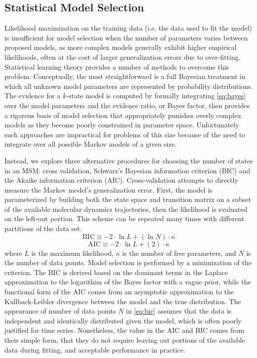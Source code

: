 \documentclass[journal=jpcbfk, layout=traditional, manuscript=article]{achemso}
\begin{document}
\subsection{Statistical Model Selection}
Likelihood maximization on the training data (i.e. the data used to fit the model) is insufficient for model selection when the number of parameters varies between proposed models, as more complex models generally exhibit higher empirical likelihoods, often at the cost of larger generalization errors due to over-fitting\cite{Liddle2007Information, Hastie01Elements}. Statistical learning theory provides a number of methods to overcome this problem. Conceptually, the most straightforward is a full Bayesian treatment in which all unknown model parameters are represented by probability distributions. The evidence for a $k$-state model is computed by formally integrating \cref{eq:bayes} over the model parameters and the evidence ratio, or Bayes factor\cite{Gelfand94Bayesian}, then provides a rigorous basis of model selection that appropriately punishes overly complex models as they become poorly constrained in parameter space. Unfortunately such approaches are impractical for problems of this size because of the need to integrate over all possible Markov models of a given size.

Instead, we explore three alternative procedures for choosing the number of states in an MSM: cross validation, Schwarz's Bayesian information criterion (BIC)\cite{Schwartz78Estimating} and the Akaike information criterion (AIC)\cite{Akaike1974AIC}. Cross-validation attempts to directly measure the Markov model's generalization error. First, the model is parameterized by building both the state space and transition matrix on a subset of the available molecular dynamics trajectories, then the likelihood is evaluated on the left-out portion. This scheme can be repeated many times with different partitions of the data set.
\begin{equation}
  \label{eq:bic}
  \mathrm{BIC} \equiv -2\cdot \ln L + \left(\ln N \right)\cdot \kappa
\end{equation}
\begin{equation}
  \label{eq:aic}
  \mathrm{AIC} \equiv -2\cdot \ln L + \left(2\right) \cdot \kappa
\end{equation} where $L$ is the maximum likelihood, $\kappa$ is the number of free parameters, and $N$ is the number of data points.  Model selection is performed by a minimization of the criterion. The BIC is derived based on the dominant terms in the Laplace approximation to the logarithim of the Bayes factor with a vague prior, while the functional form of the AIC comes from an asymptotic approximation to the Kullback-Leibler divergence between the model and the true distribution\cite{kass1995bayes, liddle2004many}. The appearance of number of data points $N$ in \cref{eq:bic} assumes that the data is independent and identically distributed given the model, which is often poorly justified for time series. Nonetheless, the value in the AIC and BIC comes from their simple form, that they do not require leaving out portions of the available data during fitting, and acceptable performance in practice\cite{Kuha01112004}.
\end{document}
